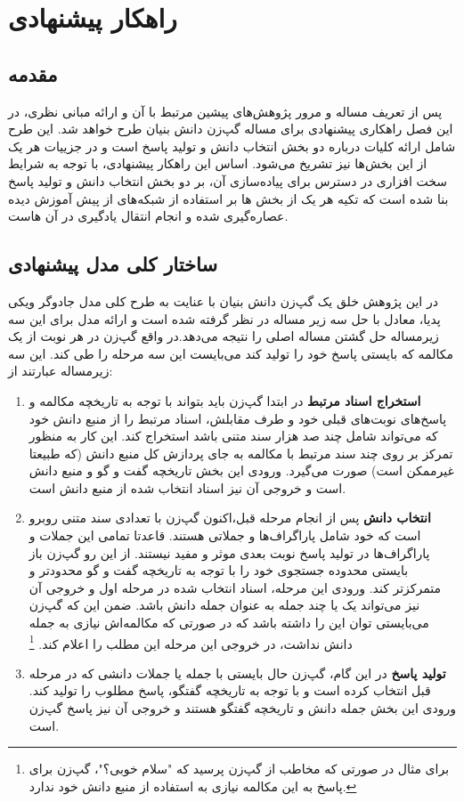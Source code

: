 \chapter{راهکار پیشنهادی}\label{chap4}
\minitoc


\section{مقدمه}
پس از تعریف مساله و مرور پژوهش‌های پیشین مرتبط با آن و ارائه مبانی نظری، در این  فصل راهکاری پیشنهادی برای مساله گپ‌زن دانش بنیان طرح خواهد شد. این طرح شامل ارائه کلیات درباره دو بخش انتخاب دانش و تولید پاسخ است و در جزییات هر یک از این بخش‌ها نیز تشریخ می‌شود. اساس این راهکار پیشنهادی، با توجه به شرایط سخت افزاری در دسترس برای پیاده‌سازی آن، بر دو بخش انتخاب دانش و تولید پاسخ بنا شده است که تکیه هر یک از بخش ‌ها بر استفاده از شبکه‌های از پیش آموزش دیده عصاره‌گیری شده و انجام انتقال یادگیری در آن هاست.


\section{ساختار کلی مدل پیشنهادی}
در این پژوهش خلق یک گپ‌زن دانش بنیان 
با عنایت به طرح کلی مدل جادوگر ویکی پدیا،
معادل با حل سه زیر مساله در نظر گرفته شده است و ارائه مدل برای این سه زیرمساله حل گشتن مساله اصلی را نتیجه می‌دهد.در واقع گپ‌زن در هر نوبت از یک مکالمه که بایستی پاسخ خود را تولید کند می‌بایست این سه مرحله را طی کند. این سه زیرمساله عبارتند از:

\begin{enumerate}
	\item 
	\textbf{استخراج اسناد مرتبط}
	در ابتدا گپ‌زن باید بتواند با توجه به تاریخچه مکالمه و پاسخ‌های نوبت‌های قبلی خود و طرف مقابلش، اسناد مرتبط را از منبع دانش خود که می‌تواند شامل چند صد هزار سند متنی باشد استخراج کند. این کار به منظور تمرکز بر روی چند سند مرتبط با مکالمه به جای پردازش کل منبع دانش (که طبیعتا غیرممکن است) صورت می‌گیرد. ورودی این بخش تاریخچه گفت‌ و گو و منبع دانش است و خروجی آن نیز اسناد انتخاب شده از منبع دانش است. 
	\item 
	\textbf{انتخاب دانش}
	پس از انجام مرحله قبل،‌اکنون گپ‌زن با تعدادی سند متنی روبرو است که خود شامل پاراگراف‌ها و جملاتی هستند. قاعدتا تمامی این جملات و پاراگراف‌ها در تولید پاسخ نوبت‌ بعدی موثر و مفید نیستند. از این رو گپ‌زن باز بایستی محدوده جستجوی خود را
	با توجه به تاریخچه گفت و گو محدودتر و متمرکزتر کند. 
	ورودی این مرحله، اسناد انتخاب شده در مرحله اول و خروجی آن نیز می‌تواند یک یا چند جمله 
	به عنوان جمله دانش باشد. ضمن این که گپ‌زن می‌بایستی توان این را داشته باشد که در صورتی که مکالمه‌اش نیازی به جمله دانش نداشت، در خروجی این مرحله این مطلب را اعلام کند. 
\footnote{برای مثال در صورتی که مخاطب از گپ‌زن پرسید که "سلام خوبی؟"، گپ‌زن برای پاسخ به این مکالمه نیازی به استفاده از منبع دانش خود ندارد.}
	\item
	\textbf{تولید پاسخ}
	در این گام، گپ‌زن حال بایستی با جمله یا جملات دانشی که در مرحله قبل انتخاب کرده است و با توجه به تاریخچه گفتگو، پاسخ مطلوب را تولید کند. ورودی این بخش جمله دانش و تاریخچه گفتگو هستند و خروجی آن نیز پاسخ گپ‌زن است. 
	
	
\end{enumerate}

